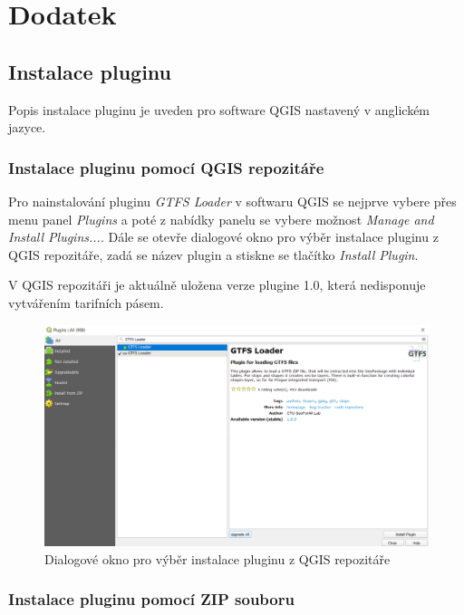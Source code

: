 \chapter{Dodatek}
\label{dodatek}

\section{Instalace pluginu}

Popis instalace pluginu je uveden pro software QGIS nastavený v anglickém jazyce. 

\subsection{Instalace pluginu pomocí QGIS repozitáře}

Pro nainstalování pluginu \textit{GTFS Loader} v softwaru QGIS se nejprve vybere přes menu 
panel \textit{Plugins} a poté z nabídky panelu se vybere možnost \textit{Manage and Install Plugins...}.
Dále se otevře dialogové okno pro výběr instalace pluginu z QGIS repozitáře, zadá se název
plugin a stiskne se tlačítko \textit{Install Plugin}.

V QGIS repozitáři je aktuálně uložena verze plugine 1.0, která nedisponuje vytvářením
tarifních pásem.  

\begin{figure}[H] \centering
    \includegraphics[width=400pt]{./pictures-dodatek/repositary.png}
    \caption[Dialogové okno pro výběr instalace pluginu z QGIS repozitáře]{Dialogové okno pro výběr instalace pluginu z QGIS repozitáře}
	\label{fig:repositary}              
\end{figure} 

\subsection{Instalace pluginu pomocí ZIP souboru}


